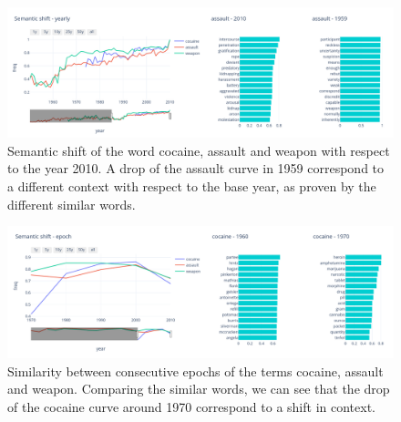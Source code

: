 \begin{figure}
\begin{center}
  \includegraphics[width=\textwidth]{images/semantic_2.png}
  \caption{Semantic shift of the word cocaine, assault and weapon 
  with respect to the year 2010. A drop of the assault curve in 1959 correspond to 
  a different context with respect to the base year, as proven by the different similar words.} \label{fig2}
\end{center}
\end{figure}

\begin{figure}
  \begin{center}
    \includegraphics[width=\textwidth]{images/semantic_1.png}
    \caption{Similarity between consecutive epochs of the terms cocaine, assault and weapon. Comparing 
    the similar words, we can see that the drop of the cocaine curve around 1970 correspond to a shift in context.} \label{fig3}
  \end{center}
\end{figure}

